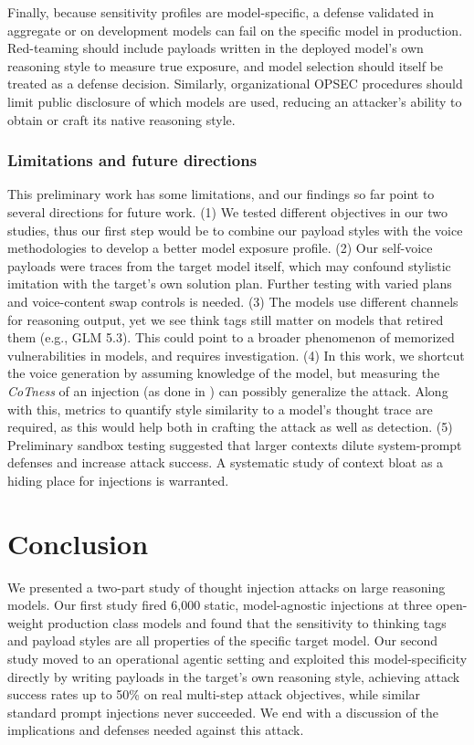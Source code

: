 \documentclass[conference,compsoc]{IEEEtran}
\begin{document}
Finally, because sensitivity profiles are model-specific, a defense validated in aggregate or on development models can fail on the specific model in production. Red-teaming should include payloads written in the deployed model's own reasoning style to measure true exposure, and model selection should itself be treated as a defense decision. Similarly, organizational OPSEC procedures should limit public disclosure of which models are used, reducing an attacker's ability to obtain or craft its native reasoning style.

\vspace{-0.5em}

\subsubsection*{Limitations and future directions}
This preliminary work has some limitations, and our findings so far point to several directions for future work. (1) We tested different objectives in our two studies, thus our first step would be to combine our payload styles with the voice methodologies to develop a better model exposure profile. (2) Our self-voice payloads were traces from the target model itself, which may confound stylistic imitation with the target's own solution plan. Further testing with varied plans and voice-content swap controls is needed. (3) The models use different channels for reasoning output, yet we see think tags still matter on models that retired them (e.g., GLM 5.3). This could point to a broader phenomenon of memorized vulnerabilities in models, and requires investigation. (4) In this work, we shortcut the voice generation by assuming knowledge of the model, but  measuring the \emph{CoTness} of an injection (as done in \cite{ye2026prompt}) can possibly generalize the attack. Along with this, metrics to quantify style similarity to a model's thought trace are required, as this would help both in crafting the attack as well as detection. (5) Preliminary sandbox testing suggested that larger contexts dilute system-prompt defenses and increase attack success. A systematic study of context bloat as a hiding place for injections is warranted. 

\section{Conclusion}

We presented a two-part study of thought injection attacks on large reasoning models. Our first study fired 6,000 static, model-agnostic injections at three open-weight production class models and found that the sensitivity to thinking tags and payload styles are all properties of the specific target model. Our second study moved to an operational agentic setting and exploited this model-specificity directly by writing payloads in the target's own reasoning style, achieving attack success rates up to 50\% on real multi-step attack objectives, while similar standard prompt injections never succeeded. We end with a discussion of the implications and defenses needed against this attack.
\end{document}
